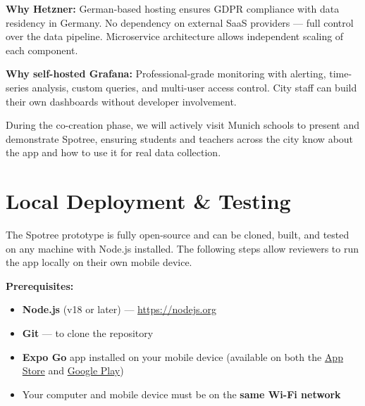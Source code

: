 \documentclass[11pt,a4paper]{article}
\begin{document}
\textbf{Why Hetzner:} German-based hosting ensures GDPR compliance with data residency in Germany. No dependency on external SaaS providers --- full control over the data pipeline. Microservice architecture allows independent scaling of each component.

\textbf{Why self-hosted Grafana:} Professional-grade monitoring with alerting, time-series analysis, custom queries, and multi-user access control. City staff can build their own dashboards without developer involvement.

During the co-creation phase, we will actively visit Munich schools to present and demonstrate Spotree, ensuring students and teachers across the city know about the app and how to use it for real data collection.

\clearpage
\section{Local Deployment \& Testing}

The Spotree prototype is fully open-source and can be cloned, built, and tested on any machine with Node.js installed. The following steps allow reviewers to run the app locally on their own mobile device.

\textbf{Prerequisites:}
\begin{itemize}
  \item \textbf{Node.js} (v18 or later) --- \url{https://nodejs.org}
  \item \textbf{Git} --- to clone the repository
  \item \textbf{Expo Go} app installed on your mobile device (available on both the \href{https://apps.apple.com/app/expo-go/id982107779}{App Store} and \href{https://play.google.com/store/apps/details?id=host.exp.exponent}{Google Play})
  \item Your computer and mobile device must be on the \textbf{same Wi-Fi network}
\end{itemize}
\end{document}
